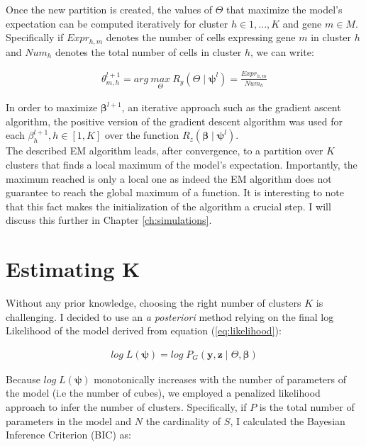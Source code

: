 Once the new partition is created, the values of $\Theta$ that maximize the model's expectation can be computed iteratively for cluster $h \in {1,...,K}$ and gene $m \in M$. Specifically if $Expr_{h,m}$ denotes the number of cells expressing gene $m$ in cluster $h$ and $Num_h$ denotes the total number of cells in cluster $h$, we can write:

\begin{align*}
\theta_{m,h}^{l+1} = arg\:\underset{\Theta}{max}\:R_y(\Theta\mid \boldsymbol{\psi}^l) = \frac{Expr_{h,m}}{Num_h}
\end{align*}

In order to maximize $\boldsymbol{\beta}^{l+1}$, an iterative approach such as the gradient ascent algorithm, the positive version of the gradient descent algorithm \citep{burges2005} was used for each $\beta_h^{l+1}, h \in [1,K]$ over the function $R_z(\boldsymbol{\beta}\mid \boldsymbol{\psi}^l)$. \\



The described EM algorithm leads, after convergence, to a partition over $K$ clusters that finds a local maximum of the model's expectation. Importantly, the maximum reached is only a local one as indeed the EM algorithm does not guarantee to reach the global maximum of a function. It is interesting to note that this fact makes the initialization of the algorithm a crucial step. I will discuss this further in Chapter \ref{ch:simulations}.\\


\section{Estimating K}
Without any prior knowledge, choosing the right number of clusters $K$ is challenging. I decided to use an {\it{a posteriori}} method relying on the final log Likelihood of the model derived from equation (\ref{eq:likelihood}):

\begin{align*}
log\;L(\boldsymbol{\psi}) = 	log\;P_G(\boldsymbol{y},\boldsymbol{z} \mid \Theta, \boldsymbol{\beta})
\end{align*}

Because $log\;L(\boldsymbol{\psi})$ monotonically increases with the number of parameters of the model (i.e the number of cubes), we employed a penalized likelihood approach to infer the number of clusters. Specifically, if $P$ is the total number of parameters in the model and $N$ the cardinality of $S$, I calculated the Bayesian Inference Criterion (BIC) \citep{burnham04} as:

